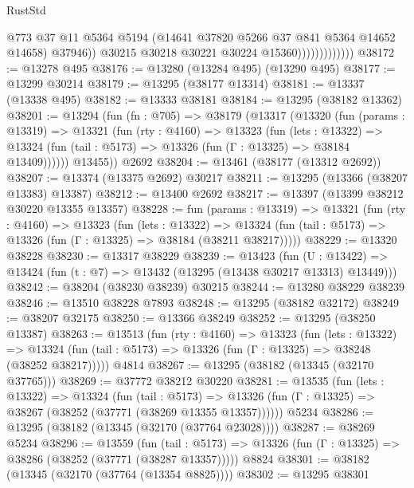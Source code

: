 \begin{lexlean}{RustStd}
\begin{coremodule}
                                  @773
                                  @37
                                  @11
                                  @5364
                                  @5194
                                  (@14641 @37820 @5266 @37 @841 @5364 @14652 @14658)
                                  @37946))
                              @30215
                              @30218
                              @30221
                              @30224
                              @15360)))))))))))))
@38172 := @13278 @495
@38176 := @13280 (@13284 @495) (@13290 @495)
@38177 := @13299 @30214
@38179 := @13295 (@38177 @13314)
@38181 := @13337 (@13338 @495)
@38182 := @13333 @38181
@38184 := @13295 (@38182 @13362)
@38201 := @13294
    (fun (fn : @705) =>
    @38179
      (@13317
        (@13320
          (fun (params : @13319) =>
          @13321
            (fun (rty : @4160) =>
            @13323
              (fun (lets : @13322) =>
              @13324 (fun (tail : @5173) => @13326 (fun (Γ : @13325) => @38184 @13409))))))
        @13455))
    @2692
@38204 := @13461 (@38177 (@13312 @2692))
@38207 := @13374 (@13375 @2692) @30217
@38211 := @13295 (@13366 (@38207 @13383) @13387)
@38212 := @13400 @2692
@38217 := @13397 (@13399 @38212 @30220 @13355 @13357)
@38228 := fun (params : @13319) =>
  @13321
    (fun (rty : @4160) =>
    @13323
      (fun (lets : @13322) =>
      @13324 (fun (tail : @5173) => @13326 (fun (Γ : @13325) => @38184 (@38211 @38217)))))
@38229 := @13320 @38228
@38230 := @13317 @38229
@38239 := @13423
    (fun (U : @13422) => @13424 (fun (t : @7) => @13432 (@13295 (@13438 @30217 @13313) @13449)))
@38242 := @38204 (@38230 @38239) @30215
@38244 := @13280 @38229 @38239
@38246 := @13510 @38228 @7893
@38248 := @13295 (@38182 @32172)
@38249 := @38207 @32175
@38250 := @13366 @38249
@38252 := @13295 (@38250 @13387)
@38263 := @13513
    (fun (rty : @4160) =>
    @13323
      (fun (lets : @13322) =>
      @13324 (fun (tail : @5173) => @13326 (fun (Γ : @13325) => @38248 (@38252 @38217)))))
    @4814
@38267 := @13295 (@38182 (@13345 (@32170 @37765)))
@38269 := @37772 @38212 @30220
@38281 := @13535
    (fun (lets : @13322) =>
    @13324
      (fun (tail : @5173) =>
      @13326 (fun (Γ : @13325) => @38267 (@38252 (@37771 (@38269 @13355 @13357))))))
    @5234
@38286 := @13295 (@38182 (@13345 (@32170 (@37764 @23028))))
@38287 := @38269 @5234
@38296 := @13559
    (fun (tail : @5173) => @13326 (fun (Γ : @13325) => @38286 (@38252 (@37771 (@38287 @13357)))))
    @8824
@38301 := @38182 (@13345 (@32170 (@37764 (@13354 @8825))))
@38302 := @13295 @38301

\end{coremodule}
\end{lexlean}
